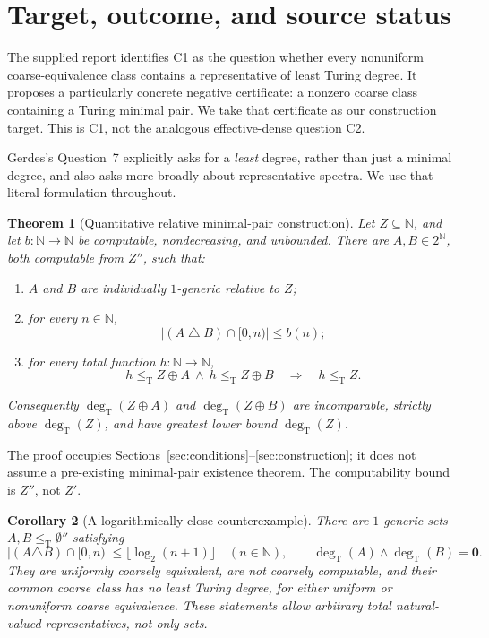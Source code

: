 \documentclass[11pt,a4paper]{article}
\newcommand{\N}{\mathbb N}
\newcommand{\Cantor}{2^{\N}}
\newcommand{\leT}{\leq_{\mathrm T}}
\newcommand{\degT}{\operatorname{deg}_{\mathrm T}}
\newcommand{\zero}{\mathbf 0}
\newtheorem{theorem}{Theorem}[section]
\newtheorem{corollary}[theorem]{Corollary}
\theoremstyle{definition}\newtheorem{definition}[theorem]{Definition}
\theoremstyle{remark}\newtheorem{remark}[theorem]{Remark}
\begin{document}
\section{Target, outcome, and source status}
\label{sec:outcome}

The supplied report identifies C1 as the question whether every nonuniform coarse-equivalence class contains a representative of least Turing degree. It proposes a particularly concrete negative certificate: a nonzero coarse class containing a Turing minimal pair. We take that certificate as our construction target. This is C1, not the analogous effective-dense question C2.\cite[entry C1 and the minimal-pair criterion]{Unified}

Gerdes's Question~7 explicitly asks for a \emph{least} degree, rather than just a minimal degree, and also asks more broadly about representative spectra.\cite[Question 7]{Gerdes} We use that literal formulation throughout.

\begin{theorem}[Quantitative relative minimal-pair construction]
\label{thm:main}
Let $Z\subseteq\N$, and let $b:\N\to\N$ be computable, nondecreasing, and unbounded. There are $A,B\in\Cantor$, both computable from $Z''$, such that:
\begin{enumerate}[label=\textup{(\roman*)}]
\item $A$ and $B$ are individually $1$-generic relative to $Z$;
\item for every $n\in\N$,
\begin{equation}\label{eq:budget-main}
       |(A\mathbin\triangle B)\cap[0,n)|\le b(n);
\end{equation}
\item for every total function $h:\N\to\N$,
\begin{equation}\label{eq:minpair-main}
 h\leT Z\oplus A\ \land\ h\leT Z\oplus B
       \quad\Longrightarrow\quad h\leT Z.
\end{equation}
\end{enumerate}
Consequently $\degT(Z\oplus A)$ and $\degT(Z\oplus B)$ are incomparable, strictly above $\degT(Z)$, and have greatest lower bound $\degT(Z)$.
\end{theorem}

The proof occupies Sections~\ref{sec:conditions}--\ref{sec:construction}; it does not assume a pre-existing minimal-pair existence theorem. The computability bound is $Z''$, not $Z'$.

\begin{corollary}[A logarithmically close counterexample]
\label{cor:headline}
There are $1$-generic sets $A,B\leT\emptyset''$ satisfying
\[
 |(A\triangle B)\cap[0,n)|\le\lfloor\log_2(n+1)\rfloor
 \quad(n\in\N),\qquad
 \degT(A)\wedge\degT(B)=\zero.
\]
They are uniformly coarsely equivalent, are not coarsely computable, and their common coarse class has no least Turing degree, for either uniform or nonuniform coarse equivalence. These statements allow arbitrary total natural-valued representatives, not only sets.
\end{corollary}
\end{document}
